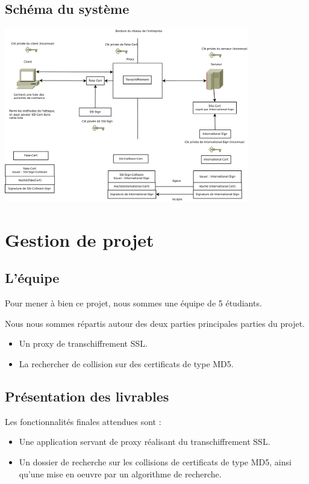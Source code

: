 \documentclass[a4paper,11pt,french]{report}
\begin{document}
\subsection{Schéma du système}
\includegraphics[width=0.8\textwidth]{../../STB/images/schema_autorites.pdf}


\section{Gestion de projet}

\subsection{L'équipe}

Pour mener à bien ce projet, nous sommes une équipe de 5 étudiants.

Nous nous sommes répartis autour des deux parties principales parties du projet.
\begin{itemize}
  \item Un proxy de transchiffrement SSL.
  \item La rechercher de collision sur des certificats de type MD5.

\end{itemize}

\subsection{Présentation des livrables}

Les fonctionnalités finales attendues sont :
\begin{itemize}
\item Une application servant de proxy réalisant du transchiffrement SSL.
\item Un dossier de recherche sur les collisions de certificats de type MD5, ainsi qu'une mise en oeuvre 
par un algorithme de recherche.
\end{itemize}
\end{document}
